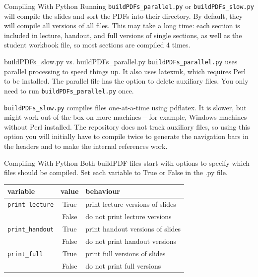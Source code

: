 \documentclass[10pt]{beamer}
\begin{document}
\begin{frame}{Compiling With Python}
Running \texttt{buildPDFs\_parallel.py} or \texttt{buildPDFs\_slow.py} will compile the slides and sort the PDFs into their directory. By default, they will compile all versions of all files. This may take a long time: each section is included in lecture, handout, and full versions of single sections, as well as the student workbook file, so most sections are compiled 4 times.\vfill

\end{frame}
\begin{frame}{{buildPDFs\_slow.py} vs. {buildPDFs\_parallel.py}}
\texttt{buildPDFs\_parallel.py} uses parallel processing to speed things up. It also uses latexmk, which requires Perl to be installed. The parallel file has the option to delete auxiliary files. You only need to run \texttt{buildPDFs\_parallel.py} once.
\vfill

\texttt{buildPDFs\_slow.py} compiles files one-at-a-time using pdflatex. It is slower, but might work out-of-the-box on more machines -- for example, Windows machines without Perl installed. The repository does not track auxiliary files, so using this option you will initially have to compile twice to generate the navigation bars in the headers and to make the internal references work.
\end{frame}
\begin{frame}{Compiling With Python}
Both buildPDF files start with options to specify which files should be compiled. Set each variable to True or False in the .py file.\vfill
\begin{tabular}{lcl}
\textbf{variable} &\textbf{ value} & \textbf{behaviour}\\\hline
\texttt{print\_lecture} & True & print lecture versions of  slides\\
 & False & do not print lecture versions
\\\hline
\texttt{print\_handout} & True & print handout versions of  slides\\
 & False & do not print handout versions
\\\hline
\texttt{print\_full} & True & print full versions of  slides\\
 & False & do not print full versions
\\\hline
\end{tabular}
\end{frame}
\end{document}
